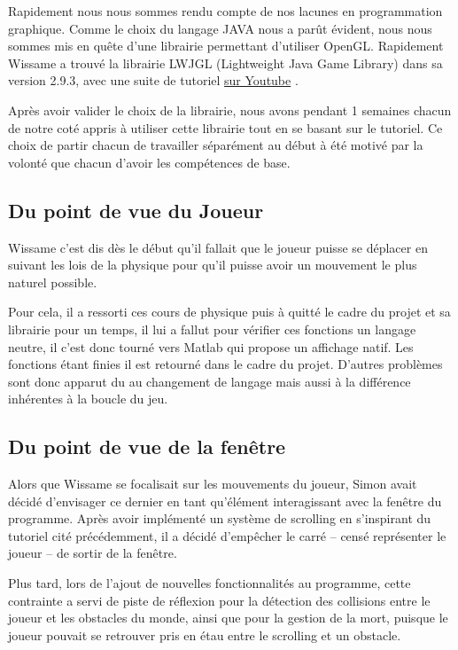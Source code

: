\documentclass[french,12pt]{article}
\begin{document}
Rapidement nous nous sommes rendu compte de nos lacunes en programmation graphique. Comme le choix du langage JAVA nous a parût évident, nous nous sommes mis en quête d'une librairie permettant d'utiliser OpenGL. Rapidement Wissame a trouvé la librairie LWJGL (Lightweight Java Game Library) dans sa version 2.9.3, avec une suite de tutoriel \href{https://www.youtube.com/watch?v=o56B1O1WwBk&list=PLq0CkcZATy27MgFJcy0HmMPVRwtDWeMlD}{sur Youtube}  .

Après avoir valider le choix de la librairie, nous avons pendant 1 semaines chacun de notre coté appris à utiliser cette librairie tout en se basant sur le tutoriel. Ce choix de partir chacun de travailler séparément au début à été motivé par la volonté que chacun d'avoir les compétences de base.

\subsection{Du point de vue du Joueur}

Wissame c'est dis dès le début qu'il fallait que le joueur puisse se déplacer en suivant les lois de la physique pour qu'il puisse avoir un mouvement le plus naturel possible.

Pour cela, il a ressorti ces cours de physique puis à quitté le cadre du projet et sa librairie pour un temps, il lui a fallut pour vérifier ces fonctions un langage neutre, il c'est donc tourné vers Matlab qui propose un affichage natif. Les fonctions étant finies il est retourné dans le cadre du projet. D'autres problèmes sont donc apparut du au changement de langage mais aussi à la différence inhérentes à la boucle du jeu.

\subsection{Du point de vue de la fenêtre}

Alors que Wissame se focalisait sur les mouvements du joueur, Simon avait décidé d'envisager ce dernier en tant qu'élément interagissant avec la fenêtre du programme. Après avoir implémenté un système de scrolling en s'inspirant du tutoriel cité précédemment, il a décidé d'empêcher le carré – censé représenter le joueur – de sortir de la fenêtre.

Plus tard, lors de l'ajout de nouvelles fonctionnalités au programme, cette contrainte a servi de piste de réflexion pour la détection des collisions entre le joueur et les obstacles du monde, ainsi que pour la gestion de la mort, puisque le joueur pouvait se retrouver pris en étau entre le scrolling et un obstacle.
\end{document}
